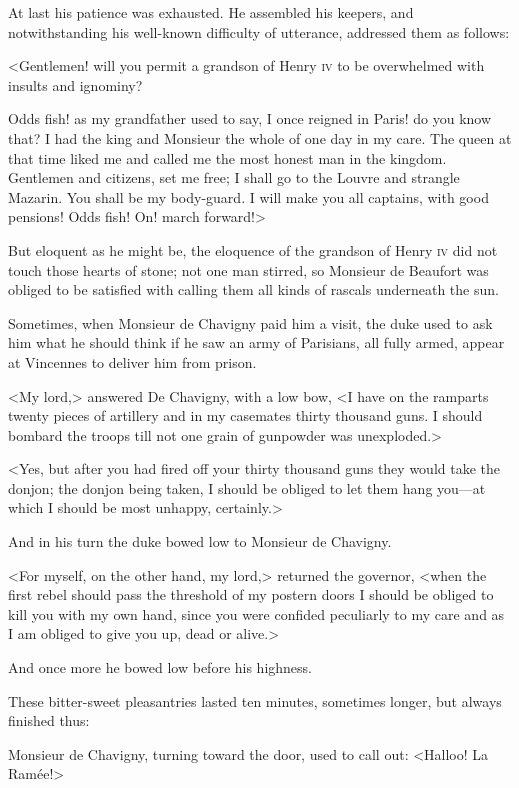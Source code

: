 At last his patience was exhausted. He assembled his keepers, and notwithstanding his well-known difficulty of utterance, addressed them as follows:

<Gentlemen! will you permit a grandson of Henry \textsc{iv} to be overwhelmed with insults and ignominy?

Odds fish! as my grandfather used to say, I once reigned in Paris! do you know that? I had the king and Monsieur the whole of one day in my care. The queen at that time liked me and called me the most honest man in the kingdom. Gentlemen and citizens, set me free; I shall go to the Louvre and strangle Mazarin. You shall be my body-guard. I will make you all captains, with good pensions! Odds fish! On! march forward!>

But eloquent as he might be, the eloquence of the grandson of Henry \textsc{iv} did not touch those hearts of stone; not one man stirred, so Monsieur de Beaufort was obliged to be satisfied with calling them all kinds of rascals underneath the sun.

Sometimes, when Monsieur de Chavigny paid him a visit, the duke used to ask him what he should think if he saw an army of Parisians, all fully armed, appear at Vincennes to deliver him from prison.

<My lord,> answered De Chavigny, with a low bow, <I have on the ramparts twenty pieces of artillery and in my casemates thirty thousand guns. I should bombard the troops till not one grain of gunpowder was unexploded.>

<Yes, but after you had fired off your thirty thousand guns they would take the donjon; the donjon being taken, I should be obliged to let them hang you—at which I should be most unhappy, certainly.>

And in his turn the duke bowed low to Monsieur de Chavigny.

<For myself, on the other hand, my lord,> returned the governor, <when the first rebel should pass the threshold of my postern doors I should be obliged to kill you with my own hand, since you were confided peculiarly to my care and as I am obliged to give you up, dead or alive.>

And once more he bowed low before his highness.

These bitter-sweet pleasantries lasted ten minutes, sometimes longer, but always finished thus:

Monsieur de Chavigny, turning toward the door, used to call out: <Halloo! La Ramée!>

